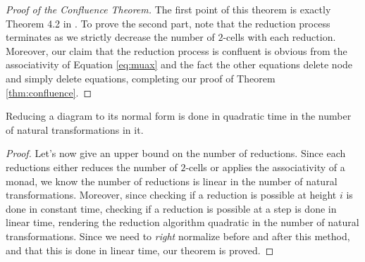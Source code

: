 \begin{proof}[Proof of the Confluence Theorem]
	The first point of this theorem is exactly Theorem 4.2
	in .
	To prove the second part, note that the reduction process terminates as
	we strictly decrease the number of $2$-cells with each reduction.
	Moreover, our claim that the reduction process is confluent is obvious
	from the associativity of Equation \eqref{eq:muax} and the fact the other
	equations delete node and simply delete equations, completing our proof
	of Theorem \ref{thm:confluence}.
\end{proof}


\begin{thm}
	Reducing a diagram to its normal form is done in quadratic time in
	the number of natural transformations in it.
\end{thm}
\begin{proof}
	Let's now give an upper bound on the number of reductions.
	Since each reductions either reduces the number of $2$-cells or applies the
	associativity of a monad, we know the number of reductions is linear in the
	number of natural transformations.
	Moreover, since checking if a reduction is possible at height $i$ is done in
	constant time, checking if a reduction is possible at a step is done in
	linear time, rendering the reduction algorithm quadratic in the number of
	natural transformations.
	Since we need to \emph{right} normalize before and after this method, and
	that this is done in linear time, our theorem is proved.
\end{proof}
